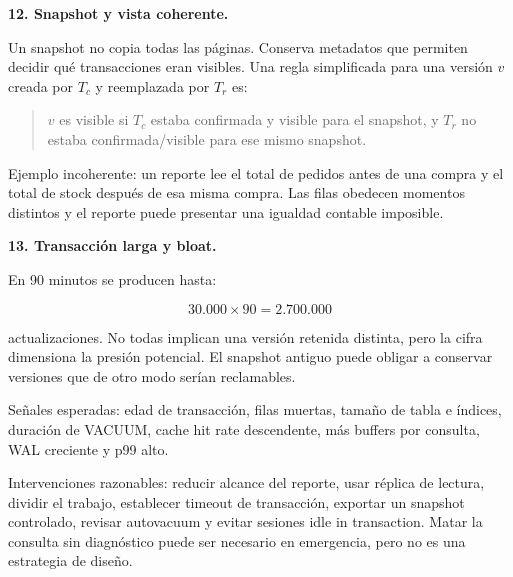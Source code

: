 \documentclass[variant=guiaresuelta,cover=institutional,mode=screen]{ua-engineering-v6-article}
\begin{document}
\begin{uaexercise}
\textbf{12. Snapshot y vista coherente.}
\end{uaexercise}
\begin{uaanswer}
Un snapshot no copia todas las páginas. Conserva metadatos que permiten decidir qué transacciones eran visibles. Una regla simplificada para una versión $v$ creada por $T_c$ y reemplazada por $T_r$ es:

\begin{quote}
$v$ es visible si $T_c$ estaba confirmada y visible para el snapshot, y $T_r$ no estaba confirmada/visible para ese mismo snapshot.
\end{quote}

Ejemplo incoherente: un reporte lee el total de pedidos antes de una compra y el total de stock después de esa misma compra. Las filas obedecen momentos distintos y el reporte puede presentar una igualdad contable imposible.
\end{uaanswer}

\begin{uaexercise}
\textbf{13. Transacción larga y bloat.}
\end{uaexercise}
\begin{uaanswer}
En 90 minutos se producen hasta:

\[
30.000 \times 90 = 2.700.000
\]

actualizaciones. No todas implican una versión retenida distinta, pero la cifra dimensiona la presión potencial. El snapshot antiguo puede obligar a conservar versiones que de otro modo serían reclamables.

Señales esperadas: edad de transacción, filas muertas, tamaño de tabla e índices, duración de VACUUM, cache hit rate descendente, más buffers por consulta, WAL creciente y p99 alto.

Intervenciones razonables: reducir alcance del reporte, usar réplica de lectura, dividir el trabajo, establecer timeout de transacción, exportar un snapshot controlado, revisar autovacuum y evitar sesiones idle in transaction. Matar la consulta sin diagnóstico puede ser necesario en emergencia, pero no es una estrategia de diseño.
\end{uaanswer}
\end{document}
